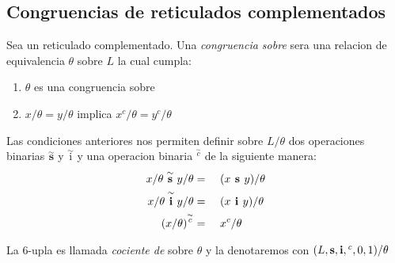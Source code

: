  \subsection{Congruencias de reticulados complementados}
  \begin{definition}
    Sea \reticulCompl un reticulado complementado. Una \emph{congruencia sobre} \reticulCompl sera una
    relacion de equivalencia $\theta$ sobre $L$ la cual cumpla: 
    \begin{enumerate}
      \item $\theta$ es una congruencia sobre \reticulAcot
      \item $x/\theta = y/\theta$ implica $x^c/\theta = y^c/\theta$
    \end{enumerate}

    Las condiciones anteriores nos permiten definir sobre $L/\theta$ dos operaciones binarias $\overset{\sim}{\textbf{s}}$ y $\overset{\sim}{\text{i}}$
    y una operacion binaria ${}^{\overset{\sim}{c}}$ de la siguiente manera:
    \begin{alignat*}{3}
      x/\theta\overset{\sim}{\textbf{ s }}y/\theta &=&\ & (x\textbf{ s }y)/\theta\\
      x/\theta\overset{\sim}{\textbf{ i }}y/\theta &=&\ & (x\textbf{ i }y)/\theta\\
      (x/\theta)^{\overset{\sim}{c}} &=&\ & x^c/\theta
    \end{alignat*}

    La 6-upla  es llamada
    \emph{cociente de} \reticulCompl sobre $\theta$ y la denotaremos con $(L, \textbf{s}, \textbf{i}, {}^c, 0, 1)/\theta$
  \end{definition}

